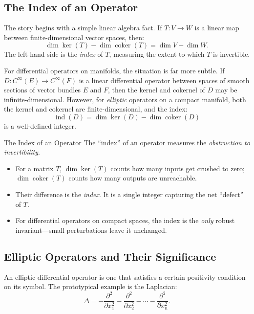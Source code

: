 \subsection{The Index of an Operator}

The story begins with a simple linear algebra fact. If $T: V \to W$ is a linear map between finite-dimensional vector spaces, then:
\[
\dim \ker(T) - \dim \operatorname{coker}(T) = \dim V - \dim W.
\]
The left-hand side is the \emph{index} of $T$, measuring the extent to which $T$ is invertible.

For differential operators on manifolds, the situation is far more subtle. If $D: C^\infty(E) \to C^\infty(F)$ is a linear differential operator between spaces of smooth sections of vector bundles $E$ and $F$, then the kernel and cokernel of $D$ may be infinite-dimensional. However, for \emph{elliptic} operators on a compact manifold, both the kernel and cokernel are finite-dimensional, and the index:
\[
\operatorname{ind}(D) = \dim \ker(D) - \dim \operatorname{coker}(D)
\]
is a well-defined integer.

\begin{knowledgebridge}{The Index of an Operator}
The ``index'' of an operator measures the \emph{obstruction to invertibility}.
\begin{itemize}
    \item For a matrix $T$, $\dim \ker(T)$ counts how many inputs get crushed to zero; $\dim \operatorname{coker}(T)$ counts how many outputs are unreachable.
    \item Their difference is the \emph{index}. It is a single integer capturing the net ``defect'' of $T$.
    \item For differential operators on compact spaces, the index is the \emph{only} robust invariant---small perturbations leave it unchanged.
\end{itemize}
\end{knowledgebridge}

\subsection{Elliptic Operators and Their Significance}

An elliptic differential operator is one that satisfies a certain positivity condition on its symbol. The prototypical example is the Laplacian:
\[
\Delta = -\frac{\partial^2}{\partial x_1^2} - \frac{\partial^2}{\partial x_2^2} - \cdots - \frac{\partial^2}{\partial x_n^2}.
\]

